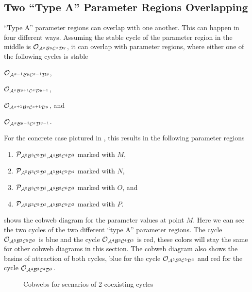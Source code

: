 \subsection{Two ``Type A'' Parameter Regions Overlapping}
\label{sec:minrep.coex.AA}

``Type A'' parameter regions can overlap with one another.
This can happen in four different ways.
Assuming the stable cycle of the parameter region in the middle is $\mathcal{O}_{\mathcal{A}^x\mathcal{B}^y\mathcal{C}^x\mathcal{D}^y}$, it can overlap with parameter regions, where either one of the following cycles is stable
\begin{enumerate*}
    \item $\mathcal{O}_{\mathcal{A}^{x-1}\mathcal{B}^y\mathcal{C}^{x-1}\mathcal{D}^y}$,
    \item $\mathcal{O}_{\mathcal{A}^x\mathcal{B}^{y+1}\mathcal{C}^x\mathcal{D}^{y+1}}$,
    \item $\mathcal{O}_{\mathcal{A}^{x+1}\mathcal{B}^y\mathcal{C}^{x+1}\mathcal{D}^y}$, and
    \item $\mathcal{O}_{\mathcal{A}^x\mathcal{B}^{y-1}\mathcal{C}^x\mathcal{D}^{y-1}}$.
\end{enumerate*}
For the concrete case pictured in , this results in the following parameter regions
\begin{enumerate}
    \item $\mathcal{P}_{\mathcal{A}^5\mathcal{B}^3\mathcal{C}^5\mathcal{D}^3, \mathcal{A}^4\mathcal{B}^3\mathcal{C}^4\mathcal{D}^3}$ marked with $M$,
    \item $\mathcal{P}_{\mathcal{A}^5\mathcal{B}^3\mathcal{C}^5\mathcal{D}^3, \mathcal{A}^5\mathcal{B}^4\mathcal{C}^5\mathcal{D}^4}$ marked with $N$,
    \item $\mathcal{P}_{\mathcal{A}^5\mathcal{B}^3\mathcal{C}^5\mathcal{D}^3, \mathcal{A}^6\mathcal{B}^3\mathcal{C}^6\mathcal{D}^3}$ marked with $O$, and
    \item $\mathcal{P}_{\mathcal{A}^5\mathcal{B}^3\mathcal{C}^5\mathcal{D}^3, \mathcal{A}^5\mathcal{B}^2\mathcal{C}^5\mathcal{D}^2}$ marked with $P$.
\end{enumerate}
 shows the cobweb diagram for the parameter values at point $M$.
Here we can see the two cycles of the two different ``type A'' parameter regions.
The cycle $\mathcal{O}_{\mathcal{A}^5\mathcal{B}^3\mathcal{C}^5\mathcal{D}^3}$ is blue and the cycle $\mathcal{O}_{\mathcal{A}^4\mathcal{B}^3\mathcal{C}^4\mathcal{D}^3}$ is red, these colors will stay the same for other cobweb diagrams in this section.
The cobweb diagram also shows the basins of attraction of both cycles, blue for the cycle $\mathcal{O}_{\mathcal{A}^5\mathcal{B}^3\mathcal{C}^5\mathcal{D}^3}$ and red for the cycle $\mathcal{O}_{\mathcal{A}^4\mathcal{B}^3\mathcal{C}^4\mathcal{D}^3}$.

\begin{figure}
    \centering
    \caption{Cobwebs for scenarios of 2 coexisting cycles}
\end{figure}

